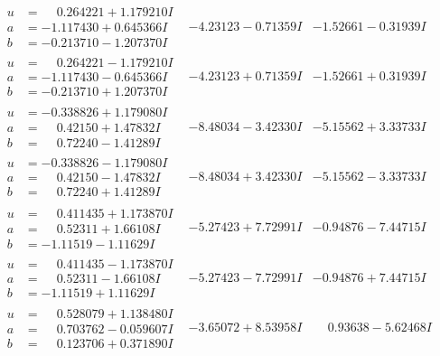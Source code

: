 \documentclass[1p]{elsarticle_modified}
\theoremstyle{definition}
\begin{document}
$$\begin{array}{c|c|c}
\begin{aligned}
u &= \phantom{-}0.264221 + 1.179210 I \\
a &= -1.117430 + 0.645366 I \\
b &= -0.213710 - 1.207370 I\end{aligned}
 & -4.23123 - 0.71359 I & -1.52661 - 0.31939 I \\ \hline\begin{aligned}
u &= \phantom{-}0.264221 - 1.179210 I \\
a &= -1.117430 - 0.645366 I \\
b &= -0.213710 + 1.207370 I\end{aligned}
 & -4.23123 + 0.71359 I & -1.52661 + 0.31939 I \\ \hline\begin{aligned}
u &= -0.338826 + 1.179080 I \\
a &= \phantom{-}0.42150 + 1.47832 I \\
b &= \phantom{-}0.72240 - 1.41289 I\end{aligned}
 & -8.48034 - 3.42330 I & -5.15562 + 3.33733 I \\ \hline\begin{aligned}
u &= -0.338826 - 1.179080 I \\
a &= \phantom{-}0.42150 - 1.47832 I \\
b &= \phantom{-}0.72240 + 1.41289 I\end{aligned}
 & -8.48034 + 3.42330 I & -5.15562 - 3.33733 I \\ \hline\begin{aligned}
u &= \phantom{-}0.411435 + 1.173870 I \\
a &= \phantom{-}0.52311 + 1.66108 I \\
b &= -1.11519 - 1.11629 I\end{aligned}
 & -5.27423 + 7.72991 I & -0.94876 - 7.44715 I \\ \hline\begin{aligned}
u &= \phantom{-}0.411435 - 1.173870 I \\
a &= \phantom{-}0.52311 - 1.66108 I \\
b &= -1.11519 + 1.11629 I\end{aligned}
 & -5.27423 - 7.72991 I & -0.94876 + 7.44715 I \\ \hline\begin{aligned}
u &= \phantom{-}0.528079 + 1.138480 I \\
a &= \phantom{-}0.703762 - 0.059607 I \\
b &= \phantom{-}0.123706 + 0.371890 I\end{aligned}
 & -3.65072 + 8.53958 I & \phantom{-}0.93638 - 5.62468 I \\ \hline\begin{aligned}

\end{aligned}
\end{array}$$
\end{document}
